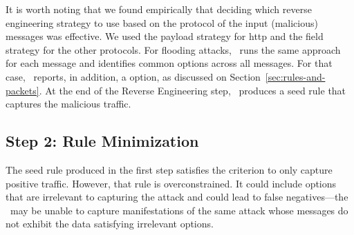 \documentclass[sigconf,review, anonymous]{acmart}
\begin{document}
It is worth noting that we found empirically that deciding which
reverse engineering strategy to use based on the protocol of the input
(malicious) messages was effective. We used the payload strategy for
http and the field strategy for the other protocols. For flooding
attacks, \tname\ runs the same approach for each message and
identifies common options across all messages. For that case,
\tname\ reports, in addition, a  option, as
discussed on Section~\ref{sec:rules-and-packets}.  At the end of the
Reverse Engineering step, \tname\ produces a seed rule that captures
the malicious traffic.





\subsection{Step 2: Rule Minimization}
\label{sec:minimization}

The seed rule produced in the first step satisfies the criterion to
only capture positive traffic. However, that rule is overconstrained.
It could include options that are irrelevant to capturing the attack
and could lead to false negatives---the \nids\ may be unable to
capture manifestations of the same attack whose messages do not
exhibit the data satisfying irrelevant options.

\end{document}
